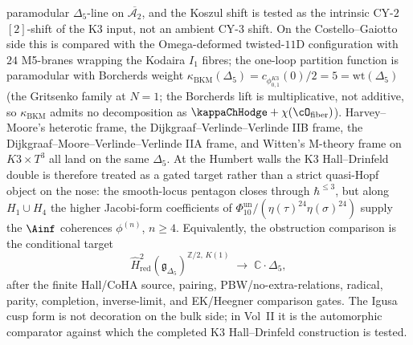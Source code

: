 paramodular $\Delta_5$-line on $\overline{\mathcal{A}_2}$, and the
Koszul shift is tested as the intrinsic CY-$2$ $[2]$-shift of the K3
input, not an ambient CY-$3$ shift. On the Costello--Gaiotto side this
is compared with the
Omega-deformed twisted-$11$D configuration with $24$ M5-branes
wrapping the Kodaira $I_1$ fibres; the one-loop partition function is
paramodular with Borcherds weight $\kappa_{\mathrm{BKM}}(\Delta_5)
= c_{\phi_{0,1}^{K3}}(0)/2 = 5 = \mathrm{wt}(\Delta_5)$ (the Gritsenko
family at $N=1$; the Borcherds lift is multiplicative, not
additive, so $\kappa_{\mathrm{BKM}}$ admits no decomposition as
$\kappaChHodge + \chi(\cO_{\mathrm{fiber}})$).
Harvey--Moore's heterotic frame, the Dijkgraaf--Verlinde--Verlinde IIB
frame, the Dijkgraaf--Moore--Verlinde--Verlinde IIA frame, and
Witten's M-theory frame on $K3\times T^3$ all land on the same
$\Delta_5$. At the Humbert walls the K3 Hall--Drinfeld double is
therefore treated as a gated target rather than a strict quasi-Hopf
object on the nose: the smooth-locus
pentagon closes through $\hbar^{\leq 3}$, but along $H_1\cup H_4$ the
higher Jacobi-form coefficients of
\(\Phi_{10}^{\mathrm{un}}/(\eta(\tau)^{24}\eta(\sigma)^{24})\) supply the
$\Ainf$ coherences $\phi^{(n)}$, $n\geq 4$. Equivalently, the
obstruction comparison is the conditional target
\[
\widehat H^2_{\mathrm{red}}\!
  \left(\mathfrak{g}_{\Delta_5}\right)^{\mathbb{Z}/2,\,K(1)}
\;\longrightarrow\;
\mathbb{C}\cdot\Delta_5,
\]
after the finite Hall/CoHA source, pairing, PBW/no-extra-relations,
radical, parity, completion, inverse-limit, and EK/Heegner comparison
gates. The Igusa cusp form is not decoration on the bulk side; in
Vol~II it is the automorphic comparator against which the completed K3
Hall--Drinfeld construction is tested.

